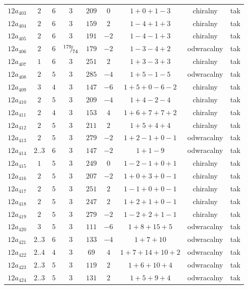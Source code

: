 \begin{longtable}{ccccccccc}
$12a_{403}$ & $2$ & $6$ & $3$ & $209$ & $0$ & $1+0+1-3$ & chiralny & tak \\
$12a_{404}$ & $2$ & $6$ & $3$ & $159$ & $2$ & $1-4+1+3$ & chiralny & tak \\
$12a_{405}$ & $2$ & $6$ & $3$ & $191$ & $-2$ & $1-4-1+3$ & chiralny & tak \\
$12a_{406}$ & $2$ & $6$ & ${}^{179}{\mskip -5mu/\mskip -3mu}_{74}$ & $179$ & $-2$ & $1-3-4+2$ & odwracalny & tak \\
$12a_{407}$ & $1$ & $6$ & $3$ & $251$ & $2$ & $1+3-3+3$ & chiralny & tak \\
$12a_{408}$ & $2$ & $5$ & $3$ & $285$ & $-4$ & $1+5-1-5$ & odwracalny & tak \\
$12a_{409}$ & $3$ & $4$ & $3$ & $147$ & $-6$ & $1+5+0-6-2$ & chiralny & tak \\
$12a_{410}$ & $2$ & $5$ & $3$ & $209$ & $-4$ & $1+4-2-4$ & chiralny & tak \\
$12a_{411}$ & $2$ & $4$ & $3$ & $153$ & $4$ & $1+6+7+7+2$ & chiralny & tak \\
$12a_{412}$ & $2$ & $5$ & $3$ & $211$ & $2$ & $1+5+4+4$ & chiralny & tak \\
$12a_{413}$ & $2$ & $5$ & $3$ & $279$ & $-2$ & $1+2-1+0-1$ & odwracalny & tak \\
$12a_{414}$ & $2..3$ & $6$ & $3$ & $147$ & $-2$ & $1+1-9$ & odwracalny & tak \\
$12a_{415}$ & $1$ & $5$ & $3$ & $249$ & $0$ & $1-2-1+0+1$ & chiralny & tak \\
$12a_{416}$ & $2$ & $5$ & $3$ & $207$ & $-2$ & $1+0+3+0-1$ & chiralny & tak \\
$12a_{417}$ & $2$ & $5$ & $3$ & $251$ & $2$ & $1-1+0+0-1$ & chiralny & tak \\
$12a_{418}$ & $2$ & $5$ & $3$ & $247$ & $2$ & $1+2+1+0-1$ & chiralny & tak \\
$12a_{419}$ & $2$ & $5$ & $3$ & $279$ & $-2$ & $1-2+2+1-1$ & chiralny & tak \\
$12a_{420}$ & $3$ & $5$ & $3$ & $111$ & $-6$ & $1+8+15+5$ & odwracalny & tak \\
$12a_{421}$ & $2..3$ & $6$ & $3$ & $133$ & $-4$ & $1+7+10$ & odwracalny & tak \\
$12a_{422}$ & $2..4$ & $4$ & $3$ & $69$ & $4$ & $1+7+14+10+2$ & odwracalny & tak \\
$12a_{423}$ & $2..3$ & $5$ & $3$ & $119$ & $2$ & $1+6+10+4$ & odwracalny & tak \\
$12a_{424}$ & $2..3$ & $5$ & $3$ & $131$ & $2$ & $1+5+9+4$ & odwracalny & tak \\

\end{longtable}
